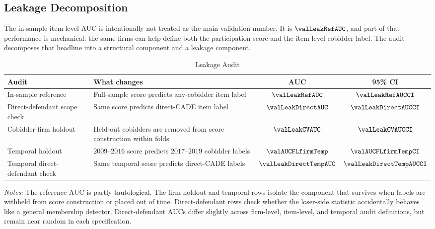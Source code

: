 \subsection{Leakage Decomposition}
\label{app:leakage_submission}

The in-sample item-level AUC is intentionally not treated as the
main validation number. It is $\valLeakRefAUC$, and part of that
performance is mechanical: the same firms can help define both
the participation score and the item-level cobidder label. The
audit decomposes that headline into a structural component and a
leakage component.

\begin{table}[htbp]
\centering
\caption{Leakage Audit}
\label{tab:leakage_audit_submission}
\footnotesize
\begin{adjustbox}{max width=\textwidth,center}
\begin{threeparttable}
\begin{tabular}{L{4.4cm}L{5.4cm}cc}
\toprule
Audit & What changes & AUC & 95\% CI \\
\midrule
In-sample reference & Full-sample score predicts any-cobidder item label
& $\valLeakRefAUC$ & $\valLeakRefAUCCI$ \\
Direct-defendant scope check & Same score predicts direct-CADE item label
& $\valLeakDirectAUC$ & $\valLeakDirectAUCCI$ \\
Cobidder-firm holdout & Held-out cobidders are removed from score construction within folds
& $\valLeakCVAUC$ & $\valLeakCVAUCCI$ \\
Temporal holdout & $2009$--$2016$ score predicts $2017$--$2019$ cobidder labels
& $\valAUCFLfirmTemp$ & $\valAUCFLfirmTempCI$ \\
Temporal direct-defendant check & Same temporal score predicts direct-CADE labels
& $\valLeakDirectTempAUC$ & $\valLeakDirectTempAUCCI$ \\
\bottomrule
\end{tabular}
\begin{tablenotes}
\footnotesize
\item \textit{Notes:} The reference AUC is partly tautological.
The firm-holdout and temporal rows isolate the component that
survives when labels are withheld from score construction or
placed out of time. Direct-defendant rows check whether the
loser-side statistic accidentally behaves like a general
membership detector.
Direct-defendant AUCs differ slightly across firm-level,
item-level, and temporal audit definitions, but remain near
random in each specification.
\end{tablenotes}
\end{threeparttable}
\end{adjustbox}
\end{table}

